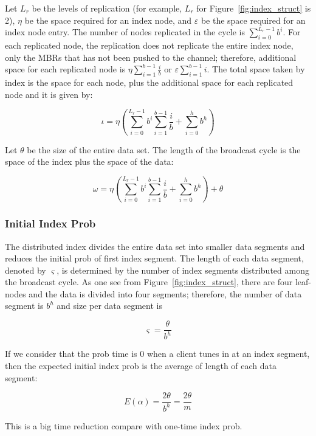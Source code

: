 Let $L_r$ be the levels of replication (for example, $L_r$ for
Figure~\ref{fig:index_struct} is 2), $\eta$ be the space required
for an index node, and $\varepsilon$ be the space required for an
index node entry. The number of nodes replicated in the cycle is
$\displaystyle\sum\limits_{i=0}^{L_r-1} b^i$. For each replicated
node, the replication does not replicate the entire index node,
only the MBRs that has not been pushed to the channel; therefore,
additional space for each replicated node is
$\eta\displaystyle\sum\limits_{i=1}^{b-1} \frac{i}{b}$ or
$\varepsilon\displaystyle\sum\limits_{i=1}^{b-1} i$. The total
space taken by index is the space for each node, plus the
additional space for each replicated node and it is given by:

\begin{equation}
\iota = \eta(\displaystyle\sum\limits_{i=0}^{L_r-1} b^i
\displaystyle\sum\limits_{i=1}^{b-1} \frac{i}{b} +
\displaystyle\sum\limits_{i=0}^h b^h)
\end{equation}

Let $\theta$ be the size of the entire data set. The length of the
broadcast cycle is the space of the index plus the space of the
data:

\begin{equation}
\omega = \eta(\displaystyle\sum\limits_{i=0}^{L_r-1} b^i
\displaystyle\sum\limits_{i=1}^{b-1} \frac{i}{b} +
\displaystyle\sum\limits_{i=0}^h b^h) + \theta
\end{equation}

\subsubsection{Initial Index Prob}

The distributed index divides the entire data set into smaller
data segments and reduces the initial prob of first index segment.
The length of each data segment, denoted by $\varsigma$, is
determined by the number of index segments distributed among the
broadcast cycle. As one see from Figure~\ref{fig:index_struct},
there are four leaf-nodes and the data is divided into four
segments; therefore, the number of data segment is $b^h$ and size
per data segment is

\begin{equation}
\varsigma = \frac{\theta}{b^h}
\end{equation}

If we consider that the prob time is 0 when a client tunes in at
an index segment, then the expected initial index prob is the
average of length of each data segment:

\begin{equation}
E(\alpha) = \frac{2\theta}{b^h} = \frac{2\theta}{m}
\end{equation}

This is a big time reduction compare with one-time index prob.
